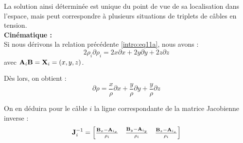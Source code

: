 La solution ainsi d\'etermin\'ee est unique du point de vue de sa localisation 
dans l'espace, mais peut correspondre \`a plusieurs situations de triplets de 
c\^ables en tension.\\

{\bf Cin\'ematique :}\\

Si nous d\'erivons la relation pr\'ec\'edente \ref{intro:eq11a}, nous avons :
\begin{equation}
2 \rho_i \partial \rho_i = 2 x \partial x + 2 y \partial y + 2 z \partial z
\label{intro:eq11a2}
\end{equation}
avec ${\bf A}_i{\bf B} = {\bf X}_i = (x, y, z)$.

D\`es lors, on obtient :
\begin{equation}
\partial \rho = \frac x \rho \partial x + \frac y \rho \partial y + \frac y 
\rho \partial z
\label{intro:eq11a3}
\end{equation}

On en d\'eduira pour le c\^able $i$ la ligne correspondante de la 
matrice Jaco\-bienne inverse :
\begin{equation}
{\bf J}^{-1}_i = 
\begin{bmatrix}
\frac {{\bf B}_x - {\bf A}_{i_x}} {\rho_i} & \frac {{\bf B}_y - {\bf A}_{i_y}} 
{\rho_i} & \frac {{\bf B}_z - {\bf A}_{i_z}} {\rho_i} 
\end{bmatrix}
\label{intro:eq11a4}
\end{equation}


\vfill